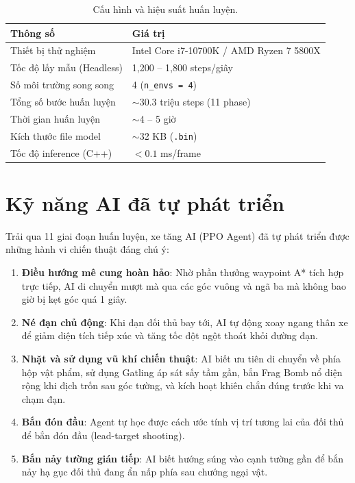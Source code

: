 \documentclass[a4paper, 12pt]{report}
\begin{document}
  \begin{table}[H]
  \centering
  \caption{Cấu hình và hiệu suất huấn luyện.}
  \label{tab:perf}
  \renewcommand{\arraystretch}{1.3}
  \begin{tabular}{l l}
    \toprule
    \textbf{Thông số} & \textbf{Giá trị} \\
    \midrule
    Thiết bị thử nghiệm        & Intel Core i7-10700K / AMD Ryzen 7 5800X \\
    Tốc độ lấy mẫu (Headless)  & 1,200 -- 1,800 steps/giây \\
    Số môi trường song song     & 4 (\texttt{n\_envs = 4}) \\
    Tổng số bước huấn luyện     & $\sim$30.3 triệu steps (11 phase) \\
    Thời gian huấn luyện        & $\sim$4 -- 5 giờ \\
    Kích thước file model       & $\sim$32 KB (\texttt{.bin}) \\
    Tốc độ inference (C++)      & $< 0.1$ ms/frame \\
    \bottomrule
  \end{tabular}
  \end{table}

  \section{Kỹ năng AI đã tự phát triển}

  Trải qua 11 giai đoạn huấn luyện, xe tăng AI (PPO Agent) đã tự phát triển được những hành vi chiến thuật đáng chú ý:

  \begin{enumerate}
    \item \textbf{Điều hướng mê cung hoàn hảo}: Nhờ phần thưởng waypoint A* tích hợp trực tiếp, AI di chuyển mượt mà qua các góc vuông và ngã ba mà không bao giờ bị kẹt góc quá 1 giây.
    \item \textbf{Né đạn chủ động}: Khi đạn đối thủ bay tới, AI tự động xoay ngang thân xe để giảm diện tích tiếp xúc và tăng tốc đột ngột thoát khỏi đường đạn.
    \item \textbf{Nhặt và sử dụng vũ khí chiến thuật}: AI biết ưu tiên di chuyển về phía hộp vật phẩm, sử dụng Gatling áp sát sấy tầm gần, bắn Frag Bomb nổ diện rộng khi địch trốn sau góc tường, và kích hoạt khiên chắn đúng trước khi va chạm đạn.
    \item \textbf{Bắn đón đầu}: Agent tự học được cách ước tính vị trí tương lai của đối thủ để bắn đón đầu (lead-target shooting).
    \item \textbf{Bắn nảy tường gián tiếp}: AI biết hướng súng vào cạnh tường gần để bắn nảy hạ gục đối thủ đang ẩn nấp phía sau chướng ngại vật.
  \end{enumerate}
\end{document}

